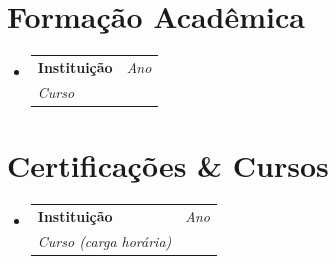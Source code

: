 \documentclass[a4paper,11pt]{article}
\makeatletter
\newcommand{\resumeSubheading}[4]{
\vspace{0.5mm}\item
    \begin{tabular*}{0.98\textwidth}[t]{l@{\extracolsep{\fill}}r}
        \textbf{#1} & \textit{\footnotesize{#4}} \\
        \textit{\footnotesize{#3}} &  \footnotesize{#2}\\
    \end{tabular*}
    \vspace{-2.4mm}
}
\newcommand{\resumeSubHeadingListStart}{\begin{itemize}[leftmargin=*,labelsep=0mm]}
\newcommand{\resumeSubHeadingListEnd}{\end{itemize}\vspace{2mm}}
\makeatother
\begin{document}
\section{\textbf{Formação Acadêmica}}
\resumeSubHeadingListStart
\resumeSubheading
{ Instituição}{ }
{Curso}{Ano}
\resumeSubHeadingListEnd

\section{\textbf{Certificações \& Cursos}}
\resumeSubHeadingListStart
\resumeSubheading
{ Instituição}{ }
{Curso \textnormal{(carga horária)}}{Ano}
\resumeSubHeadingListEnd
\end{document}
